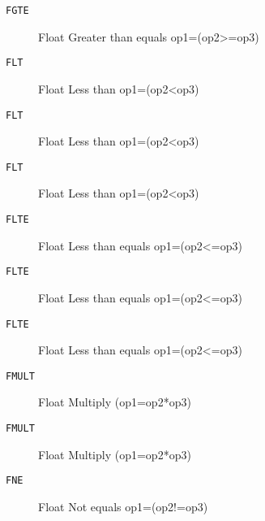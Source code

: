 
\begin{description}
\item[\texttt{FGTE       }]  Float Greater than equals op1=(op2>=op3)\\
\end{description}

\begin{description}
\item[\texttt{FLT        }]  Float Less than op1=(op2<op3)\\
\end{description}

\begin{description}
\item[\texttt{FLT        }]  Float Less than op1=(op2<op3)\\
\end{description}

\begin{description}
\item[\texttt{FLT        }]  Float Less than op1=(op2<op3)\\
\end{description}

\begin{description}
\item[\texttt{FLTE       }]  Float Less than equals op1=(op2<=op3)\\
\end{description}

\begin{description}
\item[\texttt{FLTE       }]  Float Less than equals op1=(op2<=op3)\\
\end{description}

\begin{description}
\item[\texttt{FLTE       }]  Float Less than equals op1=(op2<=op3)\\
\end{description}

\begin{description}
\item[\texttt{FMULT      }]  Float Multiply (op1=op2*op3)\\
\end{description}

\begin{description}
\item[\texttt{FMULT      }]  Float Multiply (op1=op2*op3)\\
\end{description}

\begin{description}
\item[\texttt{FNE        }]  Float Not equals op1=(op2!=op3)\\
\end{description}
